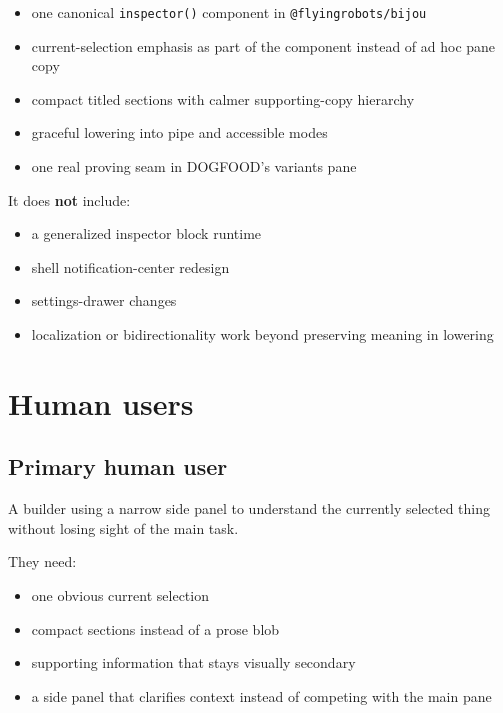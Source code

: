 \begin{itemize}
\tightlist
\item
  one canonical \texttt{i\allowbreak{}n\allowbreak{}s\allowbreak{}p\allowbreak{}e\allowbreak{}c\allowbreak{}t\allowbreak{}o\allowbreak{}r\allowbreak{}(\allowbreak{})} component in \texttt{@\allowbreak{}f\allowbreak{}l\allowbreak{}y\allowbreak{}i\allowbreak{}n\allowbreak{}g\allowbreak{}r\allowbreak{}o\allowbreak{}b\allowbreak{}o\allowbreak{}t\allowbreak{}s\allowbreak{}/\allowbreak{}b\allowbreak{}i\allowbreak{}j\allowbreak{}o\allowbreak{}u}
\item
  current-selection emphasis as part of the component instead of ad hoc pane copy
\item
  compact titled sections with calmer supporting-copy hierarchy
\item
  graceful lowering into pipe and accessible modes
\item
  one real proving seam in DOGFOOD's variants pane
\end{itemize}

It does \textbf{not} include:

\begin{itemize}
\tightlist
\item
  a generalized inspector block runtime
\item
  shell notification-center redesign
\item
  settings-drawer changes
\item
  localization or bidirectionality work beyond preserving meaning in lowering
\end{itemize}

\section{Human users}\label{record-173-human-users}

\subsection{Primary human user}\label{record-173-primary-human-user}

A builder using a narrow side panel to understand the currently selected thing without losing sight of the main task.

They need:

\begin{itemize}
\tightlist
\item
  one obvious current selection
\item
  compact sections instead of a prose blob
\item
  supporting information that stays visually secondary
\item
  a side panel that clarifies context instead of competing with the main pane
\end{itemize}

